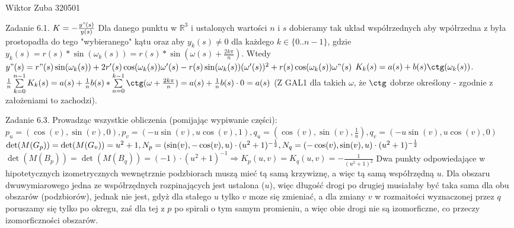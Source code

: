 \documentclass{article}
\begin{document}
Wiktor Zuba 320501
\newline

Zadanie 6.1.
\newline
\newline
$K=-\frac{y"(s)}{y(s)}$\newline
Dla danego punktu w $\mathbb{R}^3$ i ustalonych wartości $n$ i $s$ dobieramy tak układ współrzednych aby wpółrzedna z była prostopadła do tego "wybieranego" kątu
oraz aby $y_k(s)\neq 0$ dla każdego $k\in\{0..n-1\}$, gdzie $y_k(s)=r(s)*\sin(\omega_k(s))=r(s)*\sin(\omega(s)+\frac{2k\pi}{n})$.\newline
Wtedy $y"(s)=r"(s)\sin(\omega_k(s))+2r'(s)\cos(\omega_k(s))\omega'(s)-r(s)\sin(\omega_k(s))(\omega'(s))^2+r(s)\cos(\omega_k(s))\omega"(s)$\newline
$K_k(s)=a(s)+b(s)\ctg(\omega_k(s))$.\newline
$\frac{1}{n}\sum\limits_{k=0}^{n-1}K_k(s)=a(s)+\frac{1}{n}b(s)*\sum\limits_{n=0}^{k-1}\ctg(\omega+\frac{2k\pi}{n})=a(s)+\frac{1}{n}b(s)\cdot 0=a(s)$
(Z GAL1 dla takich $\omega$, że $\ctg$ dobrze określony - zgodnie z założeniami to zachodzi).
\newline

Zadanie 6.3.
\newline
\newline
Prowadząc wszystkie obliczenia (pomijając wypiwanie części):\newline
$p_u=(\cos(v),\sin(v),0),p_v=(-u\sin(v),u\cos(v),1),q_u=(\cos(v),\sin(v),\frac{1}{u}),q_v=(-u\sin(v),u\cos(v),0)$
$\det(M(G_p))=\det(M(G_v))=u^2+1,\newline
N_p=(\sin(v),-\cos(v),u)\cdot(u^2+1)^{-\frac{1}{2}},N_q=(-\cos(v),\sin(v),u)\cdot(u^2+1)^{-\frac{1}{2}}$\newline
$\det(M(B_p))=\det(M(B_q))=(-1)\cdot(u^2+1)^{-1}\Rightarrow K_p(u,v)=K_q(u,v)=-\frac{1}{(u^2+1)^2}$\newline
Dwa punkty odpowiedające w hipotetycznych izometrycznych wewnętrznie podzbiorach muszą mieć tą samą krzywiznę, a więc tą samą współrzędną $u$.
Dla obszaru dwuwymiarowego jedna ze współrzędnych rozpinających jest ustalona ($u$),
więc długość drogi po drugiej musiałaby być taka sama dla obu obszarów (podzbiorów), jednak nie jest, gdyż dla stałego $u$ tylko $v$ moze się zmieniać,
a dla zmiany $v$ w rozmaitości wyznaczonej przez $q$ poruszamy się tylko po okregu, zaś dla tej z $p$ po spirali o tym samym promieniu, a więc obie drogi nie
są izomorficzne, co przeczy izomorficzności obszarów.
\newline
\end{document}
